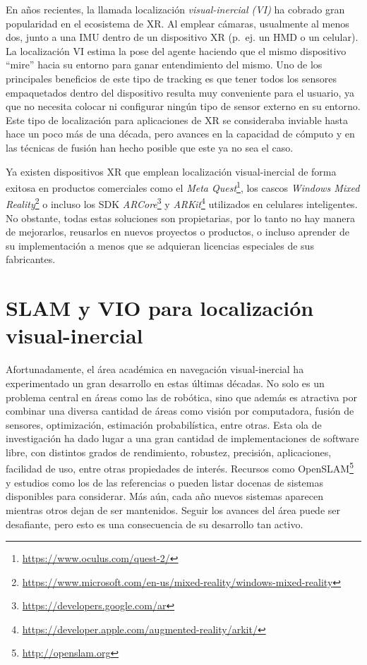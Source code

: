 \documentclass[ twoside,openright,titlepage,numbers=noenddot,%
                headinclude,footinclude,cleardoublepage=empty,abstract=on,
                BCOR=-5mm,paper=a4,fontsize=11pt
                ]{scrreprt}
\begin{document}
En años recientes, la llamada localización \emph{visual-inercial (VI)}
ha cobrado gran popularidad en el ecosistema de XR. Al emplear cámaras,
usualmente al menos dos, junto a una IMU dentro de un dispositivo XR
(p.~ej. un HMD o un celular). La localización VI estima la pose del
agente haciendo que el mismo dispositivo ``mire'' hacia su entorno para
ganar entendimiento del mismo. Uno de los principales beneficios de este
tipo de tracking es que tener todos los sensores empaquetados dentro del
dispositivo resulta muy conveniente para el usuario, ya que no necesita
colocar ni configurar ningún tipo de sensor externo en su entorno. Este
tipo de localización para aplicaciones de XR se consideraba inviable
hasta hace un poco más de una década, pero avances en la capacidad de
cómputo y en las técnicas de fusión han hecho posible que este ya no sea
el caso.

Ya existen dispositivos XR que emplean localización visual-inercial de
forma exitosa en productos comerciales como el \emph{Meta
Quest}\footnote{\url{https://www.oculus.com/quest-2/}}, los cascos
\emph{Windows Mixed Reality}\footnote{\url{https://www.microsoft.com/en-us/mixed-reality/windows-mixed-reality}}
o incluso los SDK \emph{ARCore}\footnote{\url{https://developers.google.com/ar}}
y \emph{ARKit}\footnote{\url{https://developer.apple.com/augmented-reality/arkit/}}
utilizados en celulares inteligentes. No obstante, todas estas
soluciones son propietarias, por lo tanto no hay manera de mejorarlos,
reusarlos en nuevos proyectos o productos, o incluso aprender de su
implementación a menos que se adquieran licencias especiales de sus
fabricantes.

\hypertarget{slam-y-vio-para-localizaciuxf3n-visual-inercial}{%
\section{SLAM y VIO para localización
visual-inercial}\label{slam-y-vio-para-localizaciuxf3n-visual-inercial}}

Afortunadamente, el área académica en navegación visual-inercial ha
experimentado un gran desarrollo en estas últimas décadas. No solo es un
problema central en áreas como las de robótica, sino que además es
atractiva por combinar una diversa cantidad de áreas como visión por
computadora, fusión de sensores, optimización, estimación
probabilística, entre otras. Esta ola de investigación ha dado lugar a
una gran cantidad de implementaciones de software libre, con distintos
grados de rendimiento, robustez, precisión, aplicaciones, facilidad de
uso, entre otras propiedades de interés. Recursos como
OpenSLAM\footnote{\url{http://openslam.org}} y estudios como los de las
referencias \autocite{servieresVisualVisualInertialSLAM2021} o
\autocite{taketomiVisualSLAMAlgorithms2017} pueden listar docenas de
sistemas disponibles para considerar. Más aún, cada año nuevos sistemas
aparecen mientras otros dejan de ser mantenidos. Seguir los avances del
área puede ser desafiante, pero esto es una consecuencia de su
desarrollo tan activo.
\end{document}
